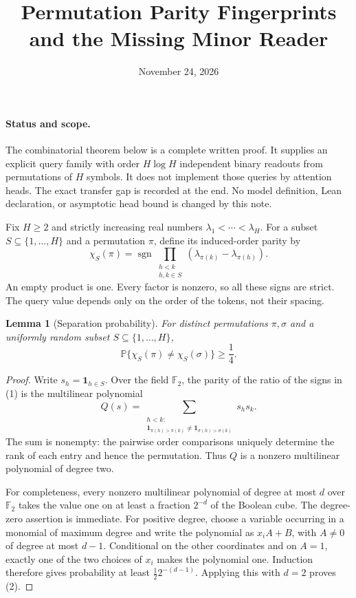 \documentclass[11pt]{article}
\title{Permutation Parity Fingerprints and the Missing Minor Reader}
\author{}
\date{November 24, 2026}
\newtheorem{lemma}[theorem]{Lemma}
\begin{document}
\maketitle

\paragraph{Status and scope.}
The combinatorial theorem below is a complete written proof. It supplies
an explicit query family with order $H\log H$ independent binary
readouts from permutations of $H$ symbols. It does not implement those
queries by attention heads. The exact transfer gap is recorded at the
end. No model definition, Lean declaration, or asymptotic head bound is
changed by this note.

Fix $H\geq2$ and strictly increasing real numbers
$\lambda_1<\cdots<\lambda_H$. For a subset $S\subseteq\{1,\ldots,H\}$
and a permutation $\pi$, define its induced-order parity by
\[
 \chi_S(\pi)=\operatorname{sgn}
 \prod_{\substack{h<k\\h,k\in S}}
       (\lambda_{\pi(k)}-\lambda_{\pi(h)}).
 \tag{1}
\]
An empty product is one. Every factor is nonzero, so all these signs
are strict. The query value depends only on the order of the tokens,
not their spacing.

\begin{lemma}[Separation probability]
For distinct permutations $\pi,\sigma$ and a uniformly random subset
$S\subseteq\{1,\ldots,H\}$,
\[
 \mathbb P\{\chi_S(\pi)\ne\chi_S(\sigma)\}\geq\frac14.
 \tag{2}
\]
\end{lemma}
\begin{proof}
Write $s_h=\mathbf1_{h\in S}$. Over the field $\mathbb F_2$, the
parity of the ratio of the signs in (1) is the multilinear polynomial
\[
 Q(s)=\sum_{\substack{h<k:\\
  \mathbf1_{\pi(h)>\pi(k)}\ne
  \mathbf1_{\sigma(h)>\sigma(k)}}} s_hs_k.
 \tag{3}
\]
The sum is nonempty: the pairwise order comparisons uniquely determine
the rank of each entry and hence the permutation. Thus $Q$ is a
nonzero multilinear polynomial of degree two.

For completeness, every nonzero multilinear polynomial of degree at
most $d$ over $\mathbb F_2$ takes the value one on at least a fraction
$2^{-d}$ of the Boolean cube. The degree-zero assertion is immediate.
For positive degree, choose a variable occurring in a monomial of
maximum degree and write the polynomial as $x_iA+B$, with $A\ne0$
of degree at most $d-1$. Conditional on the other coordinates and on
$A=1$, exactly one of the two choices of $x_i$ makes the polynomial
one. Induction therefore gives probability at least
$\tfrac12 2^{-(d-1)}$. Applying this with $d=2$ proves (2).
\end{proof}
\end{document}
